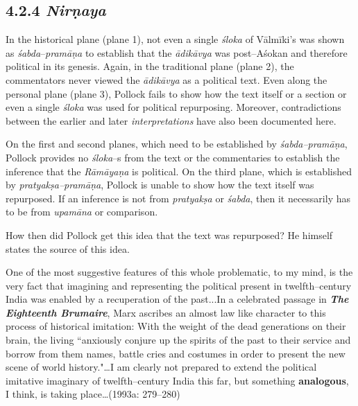 \vspace{-.3cm}

\subsection*{4.2.4 {\it {\bfseries Nirṇaya}}}

In the historical plane (plane 1), not even a single \textit{śloka} of Vālmīki’s was shown as \textit{śabda}–\textit{pramāṇa }to establish that the \textit{ādikāvya }was post–Aśokan and therefore political in its genesis. Again, in the traditional plane (plane 2), the commentators never viewed the \textit{ādikāvya} as a political text. Even along the personal plane (plane 3), Pollock fails to show how the text itself or a section or even a single \textit{śloka} was used for political repurposing. Moreover, contradictions between the earlier and later \textit{interpretations} have also been documented here.

On the first and second planes, which need to be established by \textit{śabda–pramāṇa}, Pollock provides no \textit{śloka}–s from the text or the commentaries to establish the inference that the\textit{ Rāmāyaṇa }is political. On the third plane, which is established by \textit{pratyakṣa–pramāṇa}, Pollock is unable to show how the text itself was repurposed. If an inference is not from \textit{pratyakṣa }or \textit{śabda}, then it necessarily has to be from \textit{upamāna }or comparison.

How then did Pollock get this idea that the text was repurposed? He himself states the source of this idea.

\begin{myquote}
One of the most suggestive features of this whole problematic, to my mind, is the very fact that imagining and representing the political present in twelfth–century India was enabled by a recuperation of the past...In a celebrated passage in \textit{\textbf{The Eighteenth Brumaire}}, Marx ascribes an almost law like character to this process of historical imitation: With the weight of the dead generations on their brain, the living ``anxiously conjure up the spirits of the past to their service and borrow from them names, battle cries and costumes in order to present the new scene of world history."…I am clearly not prepared to extend the political imitative imaginary of twelfth–century India this far, but something \textbf{analogous}, I think, is taking place…(1993a: 279–280)
\end{myquote}

